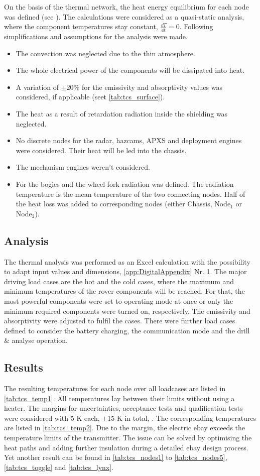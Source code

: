 On the basis of the thermal network, the heat energy equilibrium for each node was defined (see ).
The calculations were considered as a quasi-static analysis, where the component temperatures stay constant, $\frac{\dd T}{\dd t}=0$.
Following simplifications and assumptions for the analysis were made.
\begin{itemize}
	\item The convection was neglected due to the thin atmosphere.
	\item The whole electrical power of the components will be dissipated into heat.
	\item A variation of $\pm 20\%$ for the emissivity and absorptivity values was considered, if applicable (seet \autoref{tab:tcs_surface}).
	\item The heat as a result of retardation radiation inside the shielding was neglected.
	\item No discrete nodes for the radar, hazcams, APXS and deployment engines were considered. Their heat will be led into the chassis.
	\item The mechanism engines weren't considered.
	\item For the bogies  and the wheel fork radiation was defined. The radiation temperature is the mean temperature of the two connecting nodes. Half of the heat loss was added to corresponding nodes (either Chassis, Node$_1$ or Node$_2$).
\end{itemize}


\subsection{Analysis}
The thermal analysis was performed as an Excel calculation with the  possibility to adapt input values and dimensions, \autoref{app:DigitalAppendix} Nr. 1.
The major driving load cases are the  hot and the cold cases, where the maximum and minimum temperatures of the rover components will be reached.
For that, the most powerful components were set to operating mode at once or only the minimum required components were turned on, respectively.
The emissivity and absorptivity were adjusted to fulfil the cases.
There were further load cases defined to consider the  battery charging, the communication mode and the drill \& analyse operation.

\subsection{Results}
The resulting temperatures for each node over all loadcases  are listed in \autoref{tab:tcs_temp1}.
All temperatures lay between their limits without using a heater.
The margins for uncertainties, acceptance tests and qualification tests were considered with 5 K each, $\pm$15 K in total, \cite{ref_tcs_05}.
The corresponding temperatures are listed in \autoref{tab:tcs_temp2}.
Due to the margin, the electric ebay exceeds the temperature limits of the transmitter.
The issue can be solved by optimising the heat paths and adding further insulation during a detailed ebay design process.
Yet another result can be found in \autoref{tab:tcs_nodes1} to \autoref{tab:tcs_nodes5}, \autoref{tab:tcs_toggle} and  \autoref{tab:tcs_lynx}.

